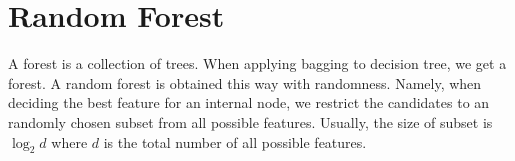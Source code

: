 \section{Random Forest}
A forest is a collection of trees. When applying bagging to decision tree, we get a forest. A random forest is
obtained this way with randomness. Namely, when deciding the best feature for an internal node, we restrict 
the candidates to an randomly chosen subset from all possible features. Usually, the size of subset is 
$\log_2 d$ where $d$ is the total number of all possible features.

% 